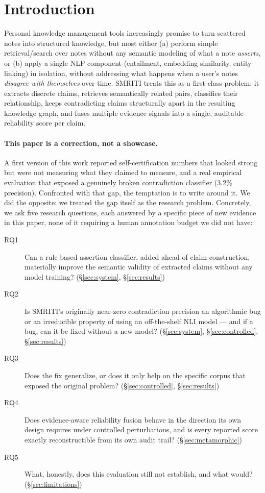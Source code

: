 \documentclass[11pt]{article}
\begin{document}
\section{Introduction}
\label{sec:intro}

Personal knowledge management tools increasingly promise to turn scattered
notes into structured knowledge, but most either (a) perform simple
retrieval/search over notes without any semantic modeling of what a note
\emph{asserts}, or (b) apply a single NLP component (entailment, embedding
similarity, entity linking) in isolation, without addressing what happens
when a user's notes \emph{disagree with themselves} over time. SMRITI
treats this as a first-class problem: it extracts discrete claims,
retrieves semantically related pairs, classifies their relationship, keeps
contradicting claims structurally apart in the resulting knowledge graph,
and fuses multiple evidence signals into a single, auditable reliability
score per claim.

\paragraph{This paper is a correction, not a showcase.} A first version of
this work reported self-certification numbers that looked strong but were
not measuring what they claimed to measure, and a real empirical evaluation
that exposed a genuinely broken contradiction classifier (3.2\% precision).
Confronted with that gap, the temptation is to write around it. We did the
opposite: we treated the gap itself as the research problem. Concretely,
we ask five research questions, each answered by a specific piece of new
evidence in this paper, none of it requiring a human annotation budget we
did not have:

\begin{description}
  \item[RQ1] Can a rule-based assertion classifier, added ahead of claim
    construction, materially improve the semantic validity of extracted
    claims without any model training? (\S\ref{sec:system}, \S\ref{sec:results})
  \item[RQ2] Is SMRITI's originally near-zero contradiction precision an
    algorithmic bug or an irreducible property of using an off-the-shelf
    NLI model --- and if a bug, can it be fixed without a new model?
    (\S\ref{sec:system}, \S\ref{sec:controlled}, \S\ref{sec:results})
  \item[RQ3] Does the fix generalize, or does it only help on the specific
    corpus that exposed the original problem?
    (\S\ref{sec:controlled}, \S\ref{sec:results})
  \item[RQ4] Does evidence-aware reliability fusion behave in the direction
    its own design requires under controlled perturbations, and is every
    reported score exactly reconstructible from its own audit trail?
    (\S\ref{sec:metamorphic})
  \item[RQ5] What, honestly, does this evaluation still not establish, and
    what would? (\S\ref{sec:limitations})
\end{description}
\end{document}
